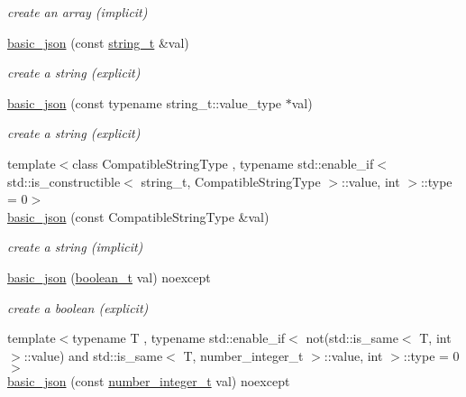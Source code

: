 \begin{DoxyCompactItemize}
\begin{DoxyCompactList}\small\item\em create an array (implicit) \end{DoxyCompactList}\item 
\hyperlink{classnlohmann_1_1basic__json_ab8b43d92a042dde96c28aeea81dd52de}{basic\+\_\+json} (const \hyperlink{classnlohmann_1_1basic__json_ab63e618bbb0371042b1bec17f5891f42}{string\+\_\+t} \&val)
\begin{DoxyCompactList}\small\item\em create a string (explicit) \end{DoxyCompactList}\item 
\hyperlink{classnlohmann_1_1basic__json_a3654da9a84deaf61899c4eee5b93c2c5}{basic\+\_\+json} (const typename string\+\_\+t\+::value\+\_\+type $\ast$val)
\begin{DoxyCompactList}\small\item\em create a string (explicit) \end{DoxyCompactList}\item 
{\footnotesize template$<$class Compatible\+String\+Type , typename std\+::enable\+\_\+if$<$                                                              std\+::is\+\_\+constructible$<$ string\+\_\+t, Compatible\+String\+Type $>$\+::value, int $>$\+::type  = 0$>$ }\\\hyperlink{classnlohmann_1_1basic__json_ae85d91b0620650bcd9993e09d0e287d9}{basic\+\_\+json} (const Compatible\+String\+Type \&val)
\begin{DoxyCompactList}\small\item\em create a string (implicit) \end{DoxyCompactList}\item 
\hyperlink{classnlohmann_1_1basic__json_aac36af84d907b5c3e469af889661620a}{basic\+\_\+json} (\hyperlink{classnlohmann_1_1basic__json_af3bc3e83aa162d7ba4df16a949872723}{boolean\+\_\+t} val) noexcept
\begin{DoxyCompactList}\small\item\em create a boolean (explicit) \end{DoxyCompactList}\item 
{\footnotesize template$<$typename T , typename std\+::enable\+\_\+if$<$                                                              not(std\+::is\+\_\+same$<$ T, int $>$\+::value) and                                                           std\+::is\+\_\+same$<$ T, number\+\_\+integer\+\_\+t $>$\+::value, int $>$\+::type  = 0$>$ }\\\hyperlink{classnlohmann_1_1basic__json_a0d838bc7ffca6017f51167e0a8ffd9b6}{basic\+\_\+json} (const \hyperlink{classnlohmann_1_1basic__json_ac4b10b2364f26ce47bdb9a413ff04a59}{number\+\_\+integer\+\_\+t} val) noexcept

\end{DoxyCompactItemize}
